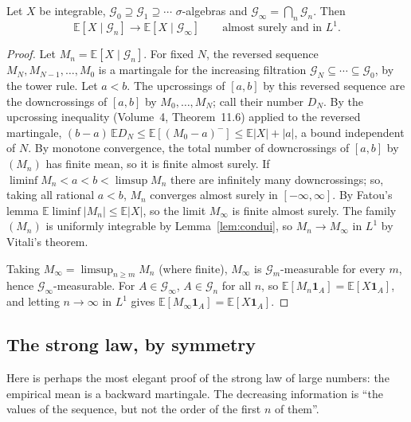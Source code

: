 \begin{theorem}\label{thm:levydown}
Let $X$ be integrable, $\mathcal G_0\supseteq\mathcal G_1\supseteq\cdots$ $\sigma$-algebras and $\mathcal G_\infty=\bigcap_n\mathcal G_n$. Then
\[
\mathbb E[X\mid\mathcal G_n]\longrightarrow\mathbb E[X\mid\mathcal G_\infty]\qquad\text{almost surely and in }L^1.
\]
\end{theorem}
\begin{proof}
Let $M_n=\mathbb E[X\mid\mathcal G_n]$. For fixed $N$, the reversed sequence $M_N,M_{N-1},\dots,M_0$ is a martingale for the increasing filtration $\mathcal G_N\subseteq\cdots\subseteq\mathcal G_0$, by the tower
rule. Let $a<b$. The upcrossings of $[a,b]$ by this reversed sequence are the downcrossings of $[a,b]$ by $M_0,\dots,M_N$; call their number $D_N$. By the upcrossing inequality (Volume~4, Theorem~11.6) applied
to the reversed martingale, $(b-a)\,\mathbb ED_N\le\mathbb E[(M_0-a)^-]\le\mathbb E|X|+|a|$, a bound independent of $N$. By monotone convergence, the total number of downcrossings of $[a,b]$ by $(M_n)$ has finite mean, so it is
finite almost surely. If $\liminf M_n<a<b<\limsup M_n$ there are infinitely many downcrossings; so, taking all rational $a<b$, $M_n$ converges almost surely in $[-\infty,\infty]$. By Fatou's lemma
$\mathbb E\liminf|M_n|\le\mathbb E|X|$, so the limit $M_\infty$ is finite almost surely. The family $(M_n)$ is uniformly integrable by Lemma~\ref{lem:condui}, so $M_n\to M_\infty$ in $L^1$ by Vitali's theorem.

Taking $M_\infty=\limsup_{n\ge m}M_n$ (where finite), $M_\infty$ is $\mathcal G_m$-measurable for every $m$, hence $\mathcal G_\infty$-measurable. For $A\in\mathcal G_\infty$, $A\in\mathcal G_n$ for all $n$, so
$\mathbb E[M_n\mathbf 1_A]=\mathbb E[X\mathbf 1_A]$, and letting $n\to\infty$ in $L^1$ gives $\mathbb E[M_\infty\mathbf 1_A]=\mathbb E[X\mathbf 1_A]$.
\end{proof}

\subsection*{The strong law, by symmetry}

Here is perhaps the most elegant proof of the strong law of large numbers: the empirical mean is a backward martingale. The decreasing information is ``the values of the sequence, but not
the order of the first $n$ of them''.

